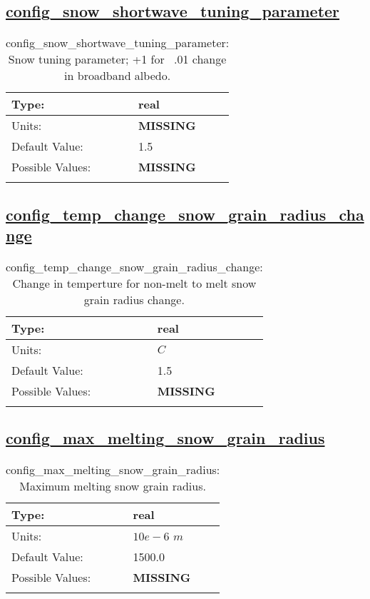 \subsection[config\_snow\_shortwave\_tuning\_parameter]{\hyperref[sec:nm_tab_shortwave]{config\_snow\_shortwave\_tuning\_parameter}}
\label{subsec:nm_sec_config_snow_shortwave_tuning_parameter}
\begin{center}
\begin{longtable}{| p{2.0in} || p{4.0in} |}
    \hline
    Type: & real \\
    \hline
    Units: & {\bf \color{red} MISSING} \\
    \hline
    Default Value: & 1.5 \\
    \hline
    Possible Values: & {\bf \color{red} MISSING} \\
    \hline
    \caption{config\_snow\_shortwave\_tuning\_parameter: Snow tuning parameter; +1 for ~.01 change in broadband albedo.}
\end{longtable}
\end{center}
\subsection[config\_temp\_change\_snow\_grain\_radius\_change]{\hyperref[sec:nm_tab_shortwave]{config\_temp\_change\_snow\_grain\_radius\_change}}
\label{subsec:nm_sec_config_temp_change_snow_grain_radius_change}
\begin{center}
\begin{longtable}{| p{2.0in} || p{4.0in} |}
    \hline
    Type: & real \\
    \hline
    Units: & $C$ \\
    \hline
    Default Value: & 1.5 \\
    \hline
    Possible Values: & {\bf \color{red} MISSING} \\
    \hline
    \caption{config\_temp\_change\_snow\_grain\_radius\_change: Change in temperture for non-melt to melt snow grain radius change.}
\end{longtable}
\end{center}
\subsection[config\_max\_melting\_snow\_grain\_radius]{\hyperref[sec:nm_tab_shortwave]{config\_max\_melting\_snow\_grain\_radius}}
\label{subsec:nm_sec_config_max_melting_snow_grain_radius}
\begin{center}
\begin{longtable}{| p{2.0in} || p{4.0in} |}
    \hline
    Type: & real \\
    \hline
    Units: & $10e-6$ $m$ \\
    \hline
    Default Value: & 1500.0 \\
    \hline
    Possible Values: & {\bf \color{red} MISSING} \\
    \hline
    \caption{config\_max\_melting\_snow\_grain\_radius: Maximum melting snow grain radius.}
\end{longtable}
\end{center}
